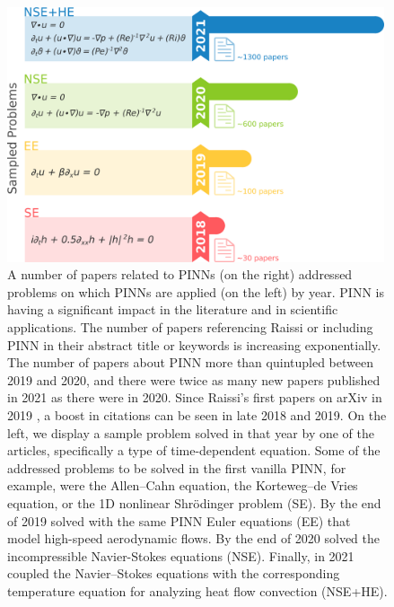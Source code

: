 \documentclass[pdflatex,sn-basic]{sn-jnl}%
\theoremstyle{thmstyleone}%
\theoremstyle{thmstyletwo}%
\theoremstyle{thmstylethree}%
\begin{document}
%
\begin{figure}[htbp]
    \centering
    \includegraphics[width=0.99\textwidth]{fig_1}
    \caption{%
A number of papers related to PINNs (on the right) addressed problems on which PINNs are applied (on the left) by year.
PINN is having a significant impact in the literature and in scientific applications.
The number of papers referencing Raissi or including PINN in their abstract title or keywords is increasing exponentially.
The number of papers about PINN more than quintupled between 2019 and 2020, and there were twice as many new papers published in 2021 as there were in 2020. 
Since Raissi's first papers on arXiv in 2019 \citep{Rai2019_PhysicsInformedNeural_PerRPK}, a boost in citations can be seen in late 2018 and 2019.
%
On the left, we display a sample problem solved in that year by one of the articles, specifically a type of time-dependent equation. 
%
Some of the addressed problems to be solved in the first vanilla PINN, for example, were the Allen–Cahn equation, the Korteweg–de Vries equation, or the 1D nonlinear Shr\"{o}dinger problem (SE). %
By the end of 2019 \cite{Mao2020_PhysicsInformedNeural_JagMJK} solved with the same PINN Euler equations (EE) that model high-speed aerodynamic flows.
By the end of 2020 \cite{Jin2021_NsfnetsNavierStokes_CaiJCLK} solved the incompressible Navier-Stokes equations (NSE).
Finally, in 2021 \cite{Cai2021_PhysicsInformedNeural_WanCWW} coupled the Navier–Stokes equations with the
corresponding temperature equation for analyzing heat flow convection (NSE+HE). %
}
    \label{fig:time}
\end{figure}
\end{document}
